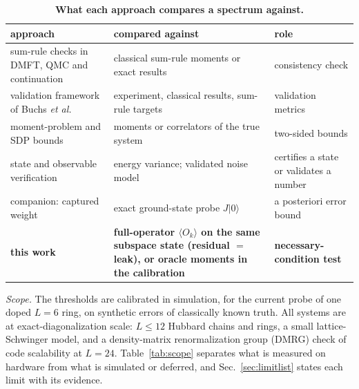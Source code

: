 \documentclass[submission, PhysCore]{SciPost}
\begin{document}
\begin{table}[t]
\caption{\textbf{What each approach compares a spectrum against.}}
\label{tab:contribution}
\small
\begin{tabular}{p{}p{}p{}}
\toprule
approach & compared against & role \tabularnewline
\midrule
\raggedright sum-rule checks in DMFT, QMC and continuation~\cite{TurkowskiFreericks2006,Freericks2009,Jarrell1996,Sandvik1998} & \raggedright classical sum-rule moments or exact results & \raggedright consistency check \tabularnewline\addlinespace[2pt]
\raggedright validation framework of Buchs \emph{et al.}~\cite{Buchs2026} & \raggedright experiment, classical results, sum-rule targets & \raggedright validation metrics \tabularnewline\addlinespace[2pt]
\raggedright moment-problem and SDP bounds~\cite{Gordon1968,Langhoff1976,ChenTrogdonUbaru2021,AbbottJayOare2025,CausalBootstrap2026,WangAcin2024,Mortimer2026} & \raggedright moments or correlators of the true system & \raggedright two-sided bounds \tabularnewline\addlinespace[2pt]
\raggedright state and observable verification~\cite{Kokail2019,OEACV2026} & \raggedright energy variance; validated noise model & \raggedright certifies a state or validates a number \tabularnewline\addlinespace[2pt]
\raggedright companion: captured weight~\cite{SQDspec2608} & \raggedright exact ground-state probe $J|0\rangle$ & \raggedright a posteriori error bound \tabularnewline
\midrule
\raggedright \textbf{this work} & \raggedright \textbf{full-operator $\langle O_k\rangle$ on the same subspace state (residual $=$ leak), or oracle moments in the calibration} & \raggedright \textbf{necessary-condition test} \tabularnewline
\bottomrule
\end{tabular}
\end{table}

\emph{Scope.} The thresholds are calibrated in simulation, for the current probe of one doped $L=6$ ring, on synthetic errors of classically known truth. All systems are at exact-diagonalization scale: $L\le12$ Hubbard chains and rings, a small lattice-Schwinger model, and a density-matrix renormalization group (DMRG) check of code scalability at $L=24$. Table~\ref{tab:scope} separates what is measured on hardware from what is simulated or deferred, and Sec.~\ref{sec:limitlist} states each limit with its evidence.
\end{document}
